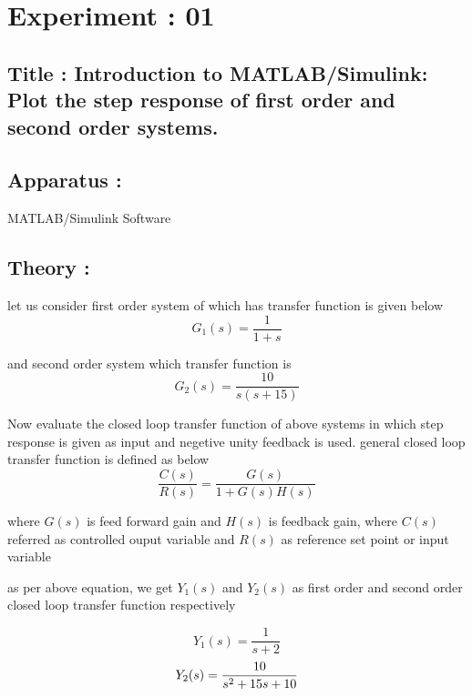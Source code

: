 \message{ !name(lab1.tex)}\documentclass[a4paper,12pt,openany]{book}
\begin{document}

\chapter{Experiment : 01}

\section{Title : Introduction to MATLAB/Simulink: Plot the step response of first order and second
order systems.}


\section{Apparatus :}
MATLAB/Simulink Software \par

\section{Theory :}
let us consider first order system of which has transfer function is given below
\begin{equation}
  G_1(s) = \frac{1}{1 + s}
\end{equation}
\par and second order system which transfer function is
\begin{equation}
 G_2(s) = \frac{10}{s(s+15)}
\end{equation}
\par
Now evaluate the closed loop transfer function of above systems in which step
response is given as input and negetive unity feedback is used. general closed
loop transfer function is defined as below
\[  \frac{C(s)}{R(s)} = \frac{G(s)}{1 + G(s)H(s)} \]
\par

where $G(s)$ is  feed forward gain and $H(s)$ is feedback gain, where $C(s)$
referred as controlled ouput variable and $R(s)$ as reference set point or input
variable \par

as per above equation, we get $Y_1(s)$ and $Y_2(s)$ as first order and
second order closed loop transfer function respectively \par
\begin{equation}
  Y_1(s) = \frac{1}{s+2}
\end{equation}
\begin{equation}
  Y_2(s) = \frac{10}{s^2+15s+10}
  \pagebreak
\end{equation}
\end{document}
